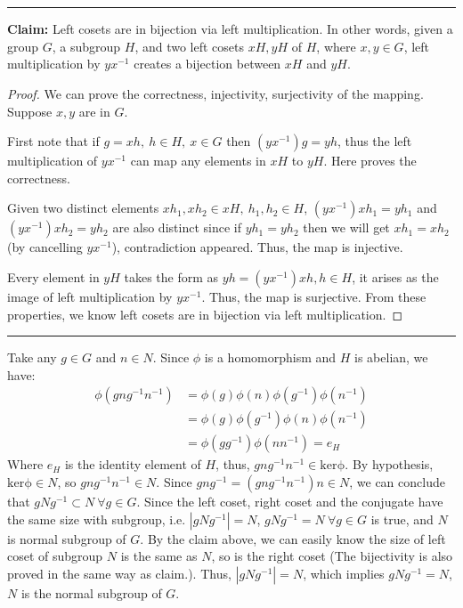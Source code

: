 \documentclass[12pt]{article}
\begin{document}
\subsection{}

\newpage
\section{} %

\noindent\rule{\textwidth}{1pt}

\textbf{Claim: } Left cosets are in bijection via left multiplication. In other words, given a group $G$, a subgroup $H$, and two left cosets $xH, yH$ of $H$, where $x,y\in G$, left multiplication by $yx^{-1}$ creates a bijection between $xH$ and $yH$.

\begin{proof}
We can prove the correctness, injectivity, surjectivity of the mapping. Suppose $x,y$ are in $G$.

First note that if $g=xh,\ h\in H,\ x\in G$ then $(yx^{-1})g=yh$, thus the left multiplication of $yx^{-1}$ can map any elements in $xH$ to $yH$. Here proves the correctness.

Given two distinct elements $xh_1, xh_2\in xH,\ h_1,h_2\in H$, $(yx^{-1})xh_1=yh_1$ and $(yx^{-1})xh_2=yh_2$ are also distinct since if $yh_1=yh_2$ then we will get $xh_1=xh_2$ (by cancelling $yx^{-1}$), contradiction appeared. Thus, the map is injective.

Every element in $yH$ takes the form as $yh=(yx^{-1})xh,h\in H$, it arises as the image of left multiplication by $yx^{-1}$. Thus, the map is surjective. From these properties, we know left cosets are in bijection via left multiplication.
\end{proof}

\noindent\rule{\textwidth}{1pt}

Take any $g\in G$ and $n\in N$. Since $\phi$ is a homomorphism and $H$ is abelian, we have:
\begin{align*}
    \phi(gng^{-1}n^{-1}) &=\phi(g)\phi(n)\phi(g^{-1})\phi(n^{-1}) \\
    &= \phi(g)\phi(g^{-1})\phi(n)\phi(n^{-1}) \\
    &= \phi(gg^{-1})\phi(nn^{-1})=e_{H}
\end{align*}
Where $e_{H}$ is the identity element of $H$, thus, $gng^{-1}n^{-1}\in\mathrm{ker\phi}$. By hypothesis, $\mathrm{ker\phi}\in N$, so $gng^{-1}n^{-1}\in N$. Since $gng^{-1}=(gng^{-1}n^{-1})n\in N$, we can conclude that $gNg^{-1}\subset N\ \forall g\in G$. Since the left coset, right coset and the conjugate have the same size with subgroup, i.e. $|gNg^{-1}|=N$, $gNg^{-1}=N\ \forall g\in G$ is true, and $N$ is normal subgroup of $G$. By the claim above, we can easily know the size of left coset of subgroup $N$ is the same as $N$, so is the right coset (The bijectivity is also proved in the same way as claim.). Thus, $|gNg^{-1}|=N$, which implies $gNg^{-1}=N$, $N$ is the normal subgroup of $G$.
\end{document}
